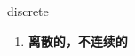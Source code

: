 
\begin{frame}
{\huge discrete}
\begin{center}
\begin{enumerate}\Large
  \item \textbf{离散的，不连续的}
\end{enumerate}
\end{center}
\end{frame}
